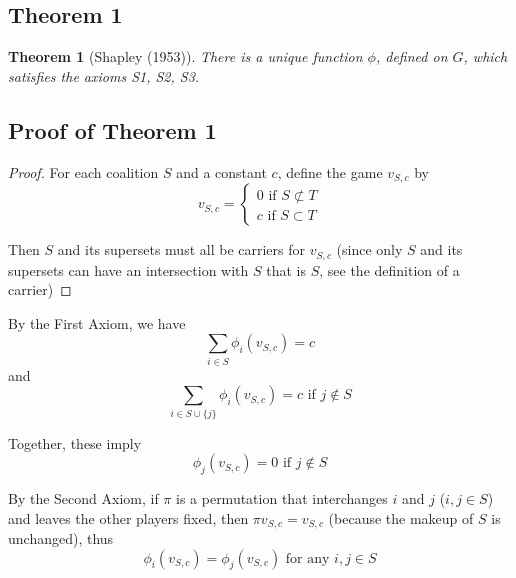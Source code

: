 \documentclass[
paper=128mm:96mm, %
fontsize=11pt, %
pagesize, %
parskip=half-, %
]{scrartcl} %
\theoremstyle{mythmstyle} %
\newtheorem{theorem}{Theorem}[section] %
\begin{document}
\subsection{Theorem 1}

\begin{theorem}[Shapley (1953)]
There is a unique function $\phi$, defined on $G$, which satisfies the axioms S1, S2, S3.
\end{theorem}
\clearpage

\subsection*{Proof of Theorem 1}

\begin{proof}
For each coalition $S$ and a constant $c$, define the game $v_{S, c}$ by
	\[ v_{S, c} = \begin{cases} 0 \text{ if } S \not\subset T \\
                                c \text{ if } S \subset T
                  \end{cases}\]
                  
Then $S$ and its supersets must all be carriers for $v_{S, c}$ (since only $S$ and its supersets can have an intersection with $S$ that is $S$, see the definition of a carrier)
\end{proof}
\clearpage

By the First Axiom, we have
	\[ \sum_{i \in S}{\phi_{i}(v_{S, c})} = c \]
and
	\[ \sum_{i \in S \cup \{j\}}{\phi_{i}(v_{S, c})} = c \text{ if } j \not\in S \]

Together, these imply
	\[ \phi_{j}(v_{S,c}) = 0 \text{ if } j \not\in S \]

\clearpage

By the Second Axiom, if $\pi$ is a permutation that interchanges $i$ and $j$ ($i, j \in S$) and leaves the other players fixed, then $\pi v_{S,c} = v_{S,c}$ (because the makeup of $S$ is unchanged), thus
	\[ \phi_{i}(v_{S,c}) = \phi_{j} (v_{S,c}) \text{ for any } i,j \in S \]

\clearpage
\end{document}
